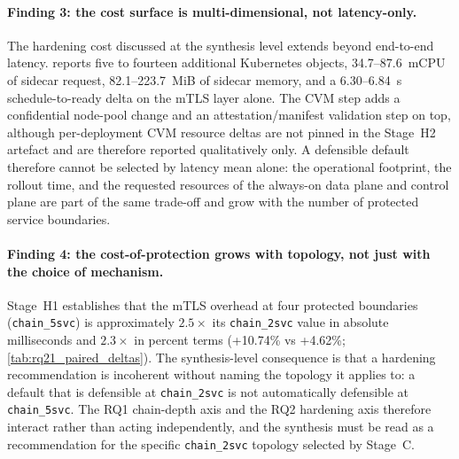 \paragraph{Finding 3: the cost surface is multi-dimensional, not
latency-only.}
The hardening cost discussed at the synthesis level extends beyond
end-to-end latency.  reports five to
fourteen additional Kubernetes objects, 34.7--87.6~mCPU of sidecar
request, 82.1--223.7~MiB of sidecar memory, and a 6.30--6.84~s
schedule-to-ready delta on the mTLS layer alone. The CVM step adds a
confidential node-pool change and an attestation/manifest validation
step on top, although per-deployment CVM resource deltas are not pinned
in the Stage~H2 artefact and are therefore reported qualitatively only. A
defensible default therefore cannot be selected by latency mean alone:
the operational footprint, the rollout time, and the requested resources
of the always-on data plane and control plane are part of the same
trade-off and grow with the number of protected service boundaries.

\paragraph{Finding 4: the cost-of-protection grows with topology, not
just with the choice of mechanism.}
Stage~H1 establishes that the mTLS overhead at four protected boundaries
(\texttt{chain\_5svc}) is approximately $2.5\times$ its
\texttt{chain\_2svc} value in absolute milliseconds and
$2.3\times$ in percent terms (+10.74\% vs +4.62\%;
\cref{tab:rq21_paired_deltas}). The synthesis-level consequence is that
a hardening recommendation is incoherent without naming the topology it
applies to: a default that is defensible at \texttt{chain\_2svc} is not
automatically defensible at \texttt{chain\_5svc}. The RQ1 chain-depth
axis and the RQ2 hardening axis therefore interact rather than acting
independently, and the synthesis must be read as a recommendation for
the specific \texttt{chain\_2svc} topology selected by Stage~C.

